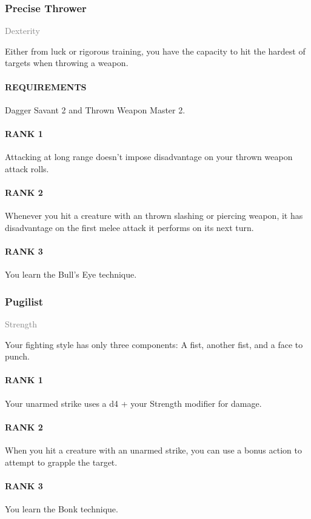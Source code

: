 \subsubsection{Precise Thrower} \label{feat::precisethrower}
\small{\textcolor{gray}{Dexterity}}

\normalsize
Either from luck or rigorous training, you have the capacity to hit the hardest of targets when throwing a weapon.
\paragraph{REQUIREMENTS} Dagger Savant 2 and Thrown Weapon Master 2.
\paragraph{RANK 1} Attacking at long range doesn't impose disadvantage on your thrown weapon attack rolls.
\paragraph{RANK 2} Whenever you hit a creature with an thrown slashing or piercing weapon, it has disadvantage on the first melee attack it performs on its next turn.
\paragraph{RANK 3} You learn the Bull's Eye technique.

\subsubsection{Pugilist} \label{feat::pugilist}
\small{\textcolor{gray}{Strength}}

\normalsize
Your fighting style has only three components:
A fist, another fist, and a face to punch.
\paragraph{RANK 1} Your unarmed strike uses a d4 + your Strength modifier for damage.
\paragraph{RANK 2} When you hit a creature with an unarmed strike, you can use a bonus action to attempt to grapple the target.
\paragraph{RANK 3} You learn the Bonk technique.

